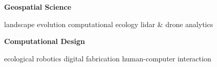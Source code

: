 \documentclass[10pt]{developercv} %
\begin{document}
\vspace{24pt}



%				

\begin{minipage}[t]{0.25\textwidth}
\textbf{Geospatial Science}
\end{minipage}
\begin{minipage}[t]{0.75\textwidth}
landscape evolution \textbullet{}
computational ecology \textbullet{}
lidar \& drone analytics\\
\end{minipage}

\begin{minipage}[t]{0.25\textwidth}
\textbf{Computational Design}
\end{minipage}
\begin{minipage}[t]{0.75\textwidth}
ecological robotics \textbullet{}
digital fabrication \textbullet{}
human-computer interaction\\
\end{minipage}
\end{document}
